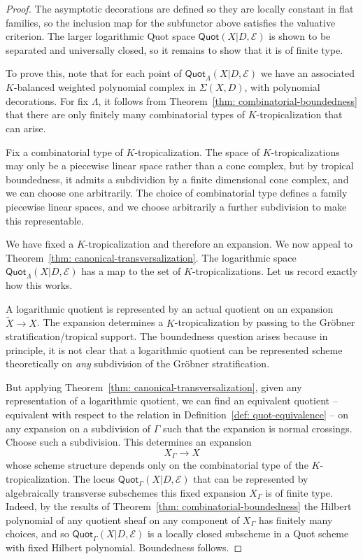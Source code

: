 \documentclass[11pt]{amsart}
\theoremstyle{definition}
\theoremstyle{definition}
\begin{document}
\begin{proof}
The asymptotic decorations are defined so they are locally constant in flat families, so the inclusion map for the subfunctor above satisfies the valuative criterion. The larger logarithmic Quot space $\mathsf{Quot}(X|D,\mathcal E)$ is shown to be separated and universally closed, so it remains to show that it is of finite type. 

To prove this, note that for each point of $\mathsf{Quot}_\Lambda(X|D,\mathcal E)$ we have an associated $K$-balanced weighted polynomial complex in $\Sigma(X,D)$, with polynomial decorations. For fix $\Lambda$, it follows from Theorem~\ref{thm: combinatorial-boundedness} that there are only finitely many combinatorial types of $K$-tropicalization that can arise. 

Fix a combinatorial type of $K$-tropicalization. The space of $K$-tropicalizations may only be a piecewise linear space rather than a cone complex, but by tropical boundedness, it admits a subdividion by a finite dimensional cone complex, and we can choose one arbitrarily. The choice of combinatorial type defines a family piecewise linear spaces, and we choose arbitrarily a further subdivision to make this representable. 

We have fixed a $K$-tropicalization and therefore an expansion. We now appeal to Theorem~\ref{thm: canonical-transversalization}. The logarithmic space $\mathsf{Quot}_\Lambda(X|D,\mathcal E)$ has a map to the set of $K$-tropicalizations. Let us record exactly how this works. 

A logarithmic quotient is represented by an actual quotient on an expansion $\widetilde X\to X$. The expansion determines a $K$-tropicalization by passing to the Gr\"obner stratification/tropical support. The boundedness question arises because in principle, it is not clear that a logarithmic quotient can be represented scheme theoretically on {\it any} subdivision of the Gr\"obner stratification. 

But applying Theorem~\ref{thm: canonical-transversalization}, given any representation of a logarithmic quotient, we can find an equivalent quotient -- equivalent with respect to the relation in Definition~\ref{def: quot-equivalence} -- on any expansion on a subdivision of $\Gamma$ such that the expansion is normal crossings. Choose such a subdivision. This determines an expansion
\[
X_\Gamma\to X
\]
whose scheme structure depends only on the combinatorial type of the $K$-tropicalization. The locus $\mathsf{Quot}_\Gamma(X|D,\mathcal E)$ that can be represented by algebraically transverse subschemes this fixed expansion $X_\Gamma$ is of finite type. Indeed, by the results of Theorem~\ref{thm: combinatorial-boundedness} the Hilbert polynomial of any quotient sheaf on any component of $X_\Gamma$ has finitely many choices, and so $\mathsf{Quot}_\Gamma(X|D,\mathcal E)$ is a locally closed subscheme in a Quot scheme with fixed Hilbert polynomial. Boundedness follows. 
\end{proof}
 


 
\end{document}
